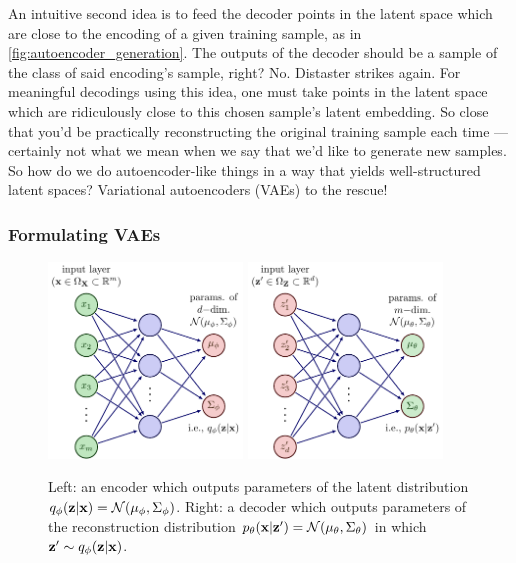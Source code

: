 \documentclass[11pt]{article}
\begin{document}
An intuitive second idea is to feed the decoder points in the latent space which are close to the encoding of a given training sample, as in \autoref{fig:autoencoder_generation}. The outputs of the decoder should be a sample of the class of said encoding's sample, right? No. Distaster strikes again. For meaningful decodings using this idea, one must take points in the latent space which are ridiculously close to this chosen sample's latent embedding. So close that you'd be practically reconstructing the original training sample each time — certainly not what we mean when we say that we'd like to generate new samples. So how do we do autoencoder-like things in a way that yields well-structured latent spaces? Variational autoencoders (VAEs) to the rescue!

\subsubsection{Formulating VAEs}
\begin{figure}[t]
    \centering %
    \includegraphics[width=0.46\textwidth]{figures/generative_models/VAE_encoder.pdf}
    \hfill
    \includegraphics[width=0.46\textwidth]{figures/generative_models/VAE_decoder.pdf}
    \caption{Left: an encoder which outputs parameters of the latent distribution $q_{\phi}(\mathbf{z}|\mathbf{x})=\mathcal{N}(\mu_{\phi},\Sigma_{\phi})$. Right: a decoder which outputs parameters of the reconstruction distribution $p_{\theta}(\mathbf{x}|\mathbf{z}')=\mathcal{N}(\mu_{\theta},\Sigma_{\theta})$ in which $\mathbf{z}'\sim q_{\phi}(\mathbf{z}|\mathbf{x})$.}
    \label{fig:VAE_architecture}
\end{figure}
\end{document}
